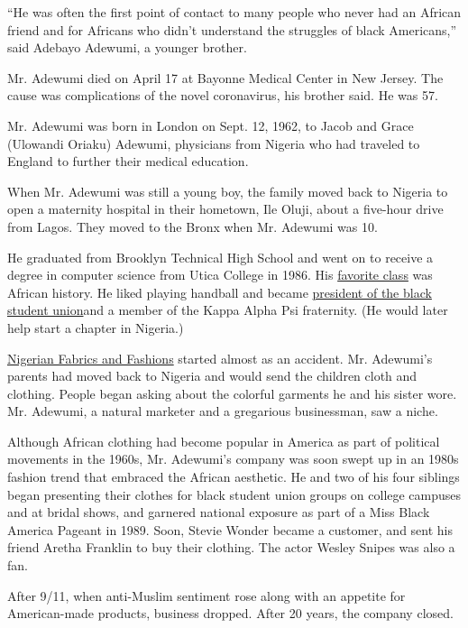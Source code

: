 ``He was often the first point of contact to many people who never had
an African friend and for Africans who didn't understand the struggles
of black Americans,'' said Adebayo Adewumi, a younger brother.

Mr. Adewumi died on April 17 at Bayonne Medical Center in New Jersey.
The cause was complications of the novel coronavirus, his brother said.
He was 57.

Mr. Adewumi was born in London on Sept. 12, 1962, to Jacob and Grace
(Ulowandi Oriaku) Adewumi, physicians from Nigeria who had traveled to
England to further their medical education.

When Mr. Adewumi was still a young boy, the family moved back to Nigeria
to open a maternity hospital in their hometown, Ile Oluji, about a
five-hour drive from Lagos. They moved to the Bronx when Mr. Adewumi was
10.

He graduated from Brooklyn Technical High School and went on to receive
a degree in computer science from Utica College in 1986. His
\href{https://www.utica.edu/campus-community/utica-stories/get-know-jonathan-adewumi-86-co-chair-metro-nyc-regional-alumni-network}{favorite
class} was African history. He liked playing handball and became
\href{https://uctangerine.com/2020/05/04/alumnus-jonathan-adewumi-86-dies-from-covid-19-he-was-bigger-than-life/}{president
of the black student union}and a member of the Kappa Alpha Psi
fraternity. (He would later help start a chapter in Nigeria.)

\href{http://www.melanet.com/nff/aboutus.html}{Nigerian Fabrics and
Fashions} started almost as an accident. Mr. Adewumi's parents had moved
back to Nigeria and would send the children cloth and clothing. People
began asking about the colorful garments he and his sister wore. Mr.
Adewumi, a natural marketer and a gregarious businessman, saw a niche.

Although African clothing had become popular in America as part of
political movements in the 1960s, Mr. Adewumi's company was soon swept
up in an 1980s fashion trend that embraced the African aesthetic. He and
two of his four siblings began presenting their clothes for black
student union groups on college campuses and at bridal shows, and
garnered national exposure as part of a Miss Black America Pageant in
1989. Soon, Stevie Wonder became a customer, and sent his friend Aretha
Franklin to buy their clothing. The actor Wesley Snipes was also a fan.

After 9/11, when anti-Muslim sentiment rose along with an appetite for
American-made products, business dropped. After 20 years, the company
closed.

